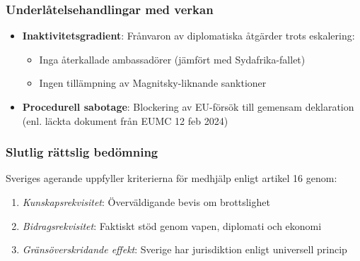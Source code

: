 \subsubsection{Underlåtelsehandlingar med verkan}
\begin{itemize}
    \item \textbf{Inaktivitetsgradient}: Frånvaron av diplomatiska åtgärder trots eskalering:
    \begin{itemize}
        \item Inga återkallade ambassadörer (jämfört med Sydafrika-fallet)
        \item Ingen tillämpning av Magnitsky-liknande sanktioner
    \end{itemize}
    
    \item \textbf{Procedurell sabotage}: Blockering av EU-försök till gemensam deklaration (enl. läckta dokument från EUMC 12 feb 2024)
\end{itemize}

\subsubsection{Slutlig rättslig bedömning}
Sveriges agerande uppfyller kriterierna för medhjälp enligt artikel 16 genom:
\begin{enumerate}
    \item \textit{Kunskapsrekvisitet}: Överväldigande bevis om brottslighet
    \item \textit{Bidragsrekvisitet}: Faktiskt stöd genom vapen, diplomati och ekonomi
    \item \textit{Gränsöverskridande effekt}: Sverige har jurisdiktion enligt universell princip
\end{enumerate}
